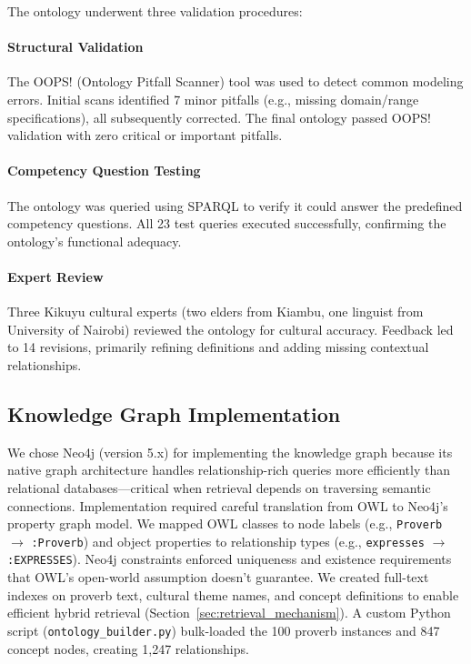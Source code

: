The ontology underwent three validation procedures:

\paragraph{Structural Validation} The OOPS! (Ontology Pitfall Scanner) \cite{poveda2014oops} tool was used to detect common modeling errors. Initial scans identified 7 minor pitfalls (e.g., missing domain/range specifications), all subsequently corrected. The final ontology passed OOPS! validation with zero critical or important pitfalls.

\paragraph{Competency Question Testing} The ontology was queried using SPARQL to verify it could answer the predefined competency questions. All 23 test queries executed successfully, confirming the ontology's functional adequacy.

\paragraph{Expert Review} Three Kikuyu cultural experts (two elders from Kiambu, one linguist from University of Nairobi) reviewed the ontology for cultural accuracy. Feedback led to 14 revisions, primarily refining definitions and adding missing contextual relationships.

\subsection{Knowledge Graph Implementation}
\label{subsec:kg_implementation}

We chose Neo4j (version 5.x) for implementing the knowledge graph because its native graph architecture handles relationship-rich queries more efficiently than relational databases—critical when retrieval depends on traversing semantic connections. Implementation required careful translation from OWL to Neo4j's property graph model. We mapped OWL classes to node labels (e.g., \texttt{Proverb} $\rightarrow$ \texttt{:Proverb}) and object properties to relationship types (e.g., \texttt{expresses} $\rightarrow$ \texttt{:EXPRESSES}). Neo4j constraints enforced uniqueness and existence requirements that OWL's open-world assumption doesn't guarantee. We created full-text indexes on proverb text, cultural theme names, and concept definitions to enable efficient hybrid retrieval (Section~\ref{sec:retrieval_mechanism}). A custom Python script (\texttt{ontology\_builder.py}) bulk-loaded the 100 proverb instances and 847 concept nodes, creating 1,247 relationships.

